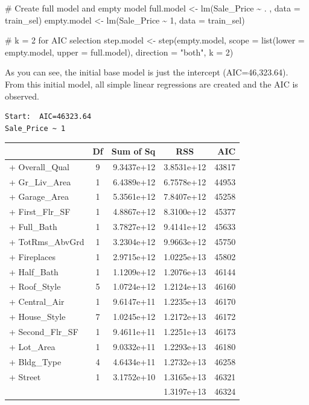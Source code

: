 \documentclass[
  letterpaper,
  DIV=11,
  numbers=noendperiod]{scrreprt}
\newenvironment{Shaded}{\begin{snugshade}}{\end{snugshade}}
\newcommand{\AttributeTok}[1]{\textcolor[rgb]{0.40,0.45,0.13}{#1}}
\newcommand{\CommentTok}[1]{\textcolor[rgb]{0.37,0.37,0.37}{#1}}
\newcommand{\DecValTok}[1]{\textcolor[rgb]{0.68,0.00,0.00}{#1}}
\newcommand{\FunctionTok}[1]{\textcolor[rgb]{0.28,0.35,0.67}{#1}}
\newcommand{\NormalTok}[1]{\textcolor[rgb]{0.00,0.23,0.31}{#1}}
\newcommand{\OtherTok}[1]{\textcolor[rgb]{0.00,0.23,0.31}{#1}}
\newcommand{\SpecialCharTok}[1]{\textcolor[rgb]{0.37,0.37,0.37}{#1}}
\newcommand{\StringTok}[1]{\textcolor[rgb]{0.13,0.47,0.30}{#1}}
\begin{document}
\begin{Shaded}
\begin{Highlighting}[]
\CommentTok{\# Create full model and empty model}
\NormalTok{full.model }\OtherTok{\textless{}{-}} \FunctionTok{lm}\NormalTok{(Sale\_Price }\SpecialCharTok{\textasciitilde{}}\NormalTok{ . , }\AttributeTok{data =}\NormalTok{ train\_sel)}
\NormalTok{empty.model }\OtherTok{\textless{}{-}} \FunctionTok{lm}\NormalTok{(Sale\_Price }\SpecialCharTok{\textasciitilde{}} \DecValTok{1}\NormalTok{, }\AttributeTok{data =}\NormalTok{ train\_sel)}

\CommentTok{\# k = 2 for AIC selection}
\NormalTok{step.model }\OtherTok{\textless{}{-}} \FunctionTok{step}\NormalTok{(empty.model,}
                  \AttributeTok{scope =} \FunctionTok{list}\NormalTok{(}\AttributeTok{lower =}\NormalTok{ empty.model,}
                               \AttributeTok{upper =}\NormalTok{ full.model),}
                  \AttributeTok{direction =} \StringTok{"both"}\NormalTok{, }\AttributeTok{k =} \DecValTok{2}\NormalTok{) }
\end{Highlighting}
\end{Shaded}

As you can see, the initial base model is just the intercept
(AIC=46,323.64). From this initial model, all simple linear regressions
are created and the AIC is observed.

\begin{verbatim}
Start:  AIC=46323.64
Sale_Price ~ 1
\end{verbatim}

\begin{longtable}[]{@{}lcrcr@{}}
\toprule()
& Df & Sum of Sq & RSS & AIC \\
\midrule()
\endhead
+ Overall\_Qual & 9 & 9.3437e+12 & 3.8531e+12 & 43817 \\
+ Gr\_Liv\_Area & 1 & 6.4389e+12 & 6.7578e+12 & 44953 \\
+ Garage\_Area & 1 & 5.3561e+12 & 7.8407e+12 & 45258 \\
+ First\_Flr\_SF & 1 & 4.8867e+12 & 8.3100e+12 & 45377 \\
+ Full\_Bath & 1 & 3.7827e+12 & 9.4141e+12 & 45633 \\
+ TotRms\_AbvGrd & 1 & 3.2304e+12 & 9.9663e+12 & 45750 \\
+ Fireplaces & 1 & 2.9715e+12 & 1.0225e+13 & 45802 \\
+ Half\_Bath & 1 & 1.1209e+12 & 1.2076e+13 & 46144 \\
+ Roof\_Style & 5 & 1.0724e+12 & 1.2124e+13 & 46160 \\
+ Central\_Air & 1 & 9.6147e+11 & 1.2235e+13 & 46170 \\
+ House\_Style & 7 & 1.0245e+12 & 1.2172e+13 & 46172 \\
+ Second\_Flr\_SF & 1 & 9.4611e+11 & 1.2251e+13 & 46173 \\
+ Lot\_Area & 1 & 9.0332e+11 & 1.2293e+13 & 46180 \\
+ Bldg\_Type & 4 & 4.6434e+11 & 1.2732e+13 & 46258 \\
+ Street & 1 & 3.1752e+10 & 1.3165e+13 & 46321 \\
& & & 1.3197e+13 & 46324 \\
\bottomrule()
\end{longtable}
\end{document}

